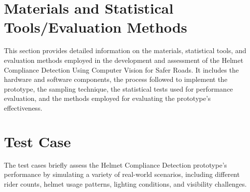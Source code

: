 \begin{refsection}
\section*{Materials and Statistical Tools/Evaluation Methods}


This section provides detailed information on the materials, statistical tools, and evaluation methods employed in the development and assessment of the Helmet Compliance Detection Using Computer Vision for Safer Roads. It includes the hardware and software components, the process followed to implement the prototype, the sampling technique, the statistical tests used for performance evaluation, and the methods employed for evaluating the prototype's effectiveness.


\section*{Test Case}


The test cases briefly assess the Helmet Compliance Detection prototype’s performance by simulating a variety of real-world scenarios, including different rider counts, helmet usage patterns, lighting conditions, and visibility challenges.



\end{refsection}
